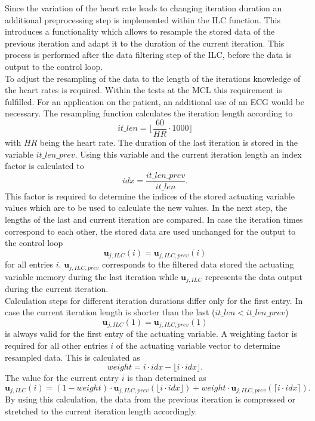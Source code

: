 Since the variation of the heart rate leads to changing iteration duration an additional preprocessing step is implemented within the ILC function. This introduces a functionality which allows to resample the stored data of the previous iteration and adapt it to the duration of the current iteration. This process is performed after the data filtering step of the ILC, before the data is output to the control loop.
\\To adjust the resampling of the data to the length of the iterations knowledge of the heart rates is required. Within the tests at the MCL this requirement is fulfilled. For an application on the patient, an additional use of an ECG would be necessary.
The resampling function calculates the iteration length according to
\begin{equation}
  it\_len = \lfloor\frac{60}{HR}\cdot1000\rfloor
\end{equation}
with $HR$ being the heart rate. The duration of the last iteration is stored in the variable $it\_len\_prev$. Using this variable and the current iteration length an index factor is calculated to
\begin{equation}
  idx = \frac{it\_len\_prev}{it\_len}.
\end{equation}
This factor is required to determine the indices of the stored actuating variable values which are to be used to calculate the new values.
In the next step, the lengths of the last and current iteration are compared. In case the iteration times correspond to each other, the stored data are used unchanged for the output to the control loop
\begin{equation}
  \mathbf{u}_{j,ILC}(i) = \mathbf{u}_{j,ILC,prev}(i)
\end{equation} for all entries $i$. $\mathbf{u}_{j,ILC,prev}$ corresponds to the filtered data stored the actuating variable memory during the last iteration while $\mathbf{u}_{j,ILC}$ represents the data output during the current iteration.
\\Calculation steps for different iteration durations differ only for the first entry. In case the current iteration length is shorter than the last ($it\_len<it\_len\_prev$)
\begin{equation}
  \mathbf{u}_{j,ILC}(1) = \mathbf{u}_{j,ILC,prev}(1)
\end{equation} is always valid for the first entry of the actuating variable.
A weighting factor is required for all other entries $i$ of the actuating variable vector to determine resampled data. This is calculated as
\begin{equation}
  weight= i \cdot idx - \lfloor i \cdot idx\rfloor.
\end{equation}
The value for the current entry $i$ is than determined as
\begin{equation}
  \mathbf{u}_{j,ILC}(i) = (1-weight) \cdot \mathbf{u}_{j,ILC,prev}(\lfloor i \cdot idx\rfloor) + weight\cdot \mathbf{u}_{j,ILC,prev}(\lceil i \cdot idx\rceil).
\end{equation}
By using this calculation, the data from the previous iteration is compressed or stretched to the current iteration length accordingly.

